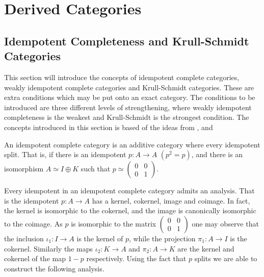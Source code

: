 \chapter{Derived Categories}

\section{Idempotent Completeness and Krull-Schmidt Categories}

    This section will introduce the concepts of idempotent complete categories, weakly idempotent complete categories and Krull-Schmidt categories. These are extra conditions which may be put onto an exact category. The conditions to be introduced are three different levels of strengthening, where weakly idempotent completeness is the weakest and Krull-Schmidt is the strongest condition. The concepts introduced in this section is based of the ideas from \cite{buhler}, \cite{Kra12} and \cite{Rei95}

    \begin{definition}
        An idempotent complete category is an additive category where every idempotent split. That is, if there is an idempotent $p:A\rightarrow A$ $(p^2=p)$, and there is an isomorphism $A\simeq I\oplus K$ such that $p\simeq \begin{pmatrix} 0 & 0 \\ 0 & 1 \end{pmatrix}$. 
    \end{definition}

    Every idempotent in an idempotent complete category admits an analysis. That is the idempotent $p:A\rightarrow A$ has a kernel, cokernel, image and coimage. In fact, the kernel is isomorphic to the cokernel, and the image is canonically isomorphic to the coimage. As $p$ is isomorphic to the matrix $\begin{pmatrix} 0 & 0 \\ 0 & 1 \end{pmatrix}$ one may observe that the inclusion $\iota_1:I\rightarrow A$ is the kernel of $p$, while the projection $\pi_1:A\rightarrow I$ is the cokernel. Similarly the maps $\iota_2:K\rightarrow A$ and $\pi_2:A\rightarrow K$ are the kernel and cokernel of the map $1-p$ respectively. Using the fact that $p$ splits we are able to construct the following analysis.

    \begin{center}
    \end{center}

